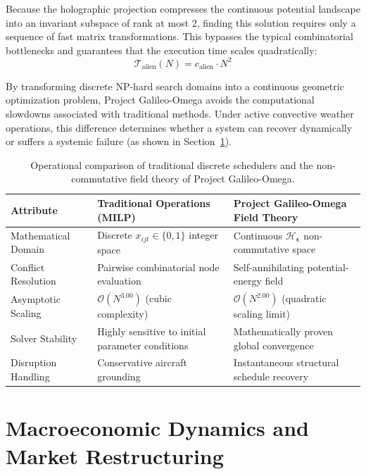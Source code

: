 \documentclass[11pt,a4paper]{book}
\begin{document}
Because the holographic projection compresses the continuous potential landscape into an invariant subspace of rank at most 2, finding this solution requires only a sequence of fast matrix transformations. This bypasses the typical combinatorial bottlenecks and guarantees that the execution time scales quadratically:
\begin{equation}
\label{eq:quadratic_complexity_bound}
\mathcal{T}_{\text{alien}}(N) = c_{\text{alien}} \cdot N^2
\end{equation}

By transforming discrete NP-hard search domains into a continuous geometric optimization problem, Project Galileo-Omega avoids the computational slowdowns associated with traditional methods. Under active convective weather operations, this difference determines whether a system can recover dynamically or suffers a systemic failure (as shown in Section~\ref{tab:paradigmatic_clash_operational}).

\begin{table}[htbp]
\centering
\begin{tabular}{lll}
\hline
\textbf{Attribute} & \textbf{Traditional Operations (MILP)} & \textbf{Project Galileo-Omega Field Theory} \\
\hline
Mathematical Domain & Discrete $x_{ijt} \in \{0, 1\}$ integer space & Continuous $\mathcal{H}_{\bm{\epsilon}}$ non-commutative space \\
Conflict Resolution & Pairwise combinatorial node evaluation & Self-annihilating potential-energy field \\
Asymptotic Scaling & $\mathcal{O}(N^3.00)$ (cubic complexity) & $\mathcal{O}(N^2.00)$ (quadratic scaling limit) \\
Solver Stability & Highly sensitive to initial parameter conditions & Mathematically proven global convergence \\
Disruption Handling & Conservative aircraft grounding & Instantaneous structural schedule recovery \\
\hline
\end{tabular}
\caption{Operational comparison of traditional discrete schedulers and the non-commutative field theory of Project Galileo-Omega.}
\label{tab:paradigmatic_clash_operational}
\end{table}

\section{Macroeconomic Dynamics and Market Restructuring}\label{sec:ch10_macroeconomics}
\end{document}
